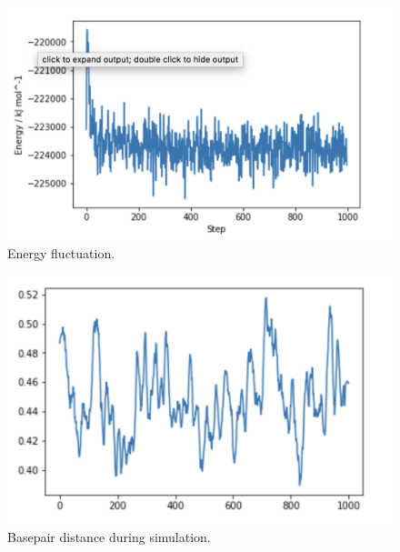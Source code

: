 \documentclass{article}
\begin{document}
\begin{figure}
  \includegraphics{energy_fluc}
  \caption{Energy fluctuation.}
  \label{f1}
\end{figure}

\begin{figure}
  \includegraphics{basepair_distance}
  \caption{Basepair distance during simulation.}
  \label{f1}
\end{figure}
\end{document}
